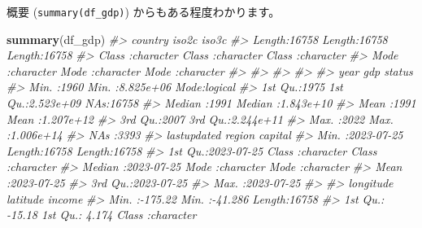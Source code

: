 \documentclass[
  xelatex, ja=standard]{bxjsbook}
\newenvironment{Shaded}{\begin{snugshade}}{\end{snugshade}}
\newcommand{\CommentTok}[1]{\textcolor[rgb]{0.56,0.35,0.01}{\textit{#1}}}
\newcommand{\FunctionTok}[1]{\textcolor[rgb]{0.13,0.29,0.53}{\textbf{#1}}}
\newcommand{\NormalTok}[1]{#1}
\theoremstyle{definition}
\theoremstyle{definition}
\theoremstyle{definition}
\theoremstyle{definition}
\theoremstyle{remark}
\begin{document}
概要 (\texttt{summary(df\_gdp)}) からもある程度わかります。

\begin{Shaded}
\begin{Highlighting}[]
\FunctionTok{summary}\NormalTok{(df\_gdp) }
\CommentTok{\#\textgreater{}    country             iso2c              iso3c          }
\CommentTok{\#\textgreater{}  Length:16758       Length:16758       Length:16758      }
\CommentTok{\#\textgreater{}  Class :character   Class :character   Class :character  }
\CommentTok{\#\textgreater{}  Mode  :character   Mode  :character   Mode  :character  }
\CommentTok{\#\textgreater{}                                                          }
\CommentTok{\#\textgreater{}                                                          }
\CommentTok{\#\textgreater{}                                                          }
\CommentTok{\#\textgreater{}                                                          }
\CommentTok{\#\textgreater{}       year           gdp             status       }
\CommentTok{\#\textgreater{}  Min.   :1960   Min.   :8.825e+06   Mode:logical  }
\CommentTok{\#\textgreater{}  1st Qu.:1975   1st Qu.:2.523e+09   NA\textquotesingle{}s:16758    }
\CommentTok{\#\textgreater{}  Median :1991   Median :1.843e+10                 }
\CommentTok{\#\textgreater{}  Mean   :1991   Mean   :1.207e+12                 }
\CommentTok{\#\textgreater{}  3rd Qu.:2007   3rd Qu.:2.244e+11                 }
\CommentTok{\#\textgreater{}  Max.   :2022   Max.   :1.006e+14                 }
\CommentTok{\#\textgreater{}                 NA\textquotesingle{}s   :3393                      }
\CommentTok{\#\textgreater{}   lastupdated            region            capital         }
\CommentTok{\#\textgreater{}  Min.   :2023{-}07{-}25   Length:16758       Length:16758      }
\CommentTok{\#\textgreater{}  1st Qu.:2023{-}07{-}25   Class :character   Class :character  }
\CommentTok{\#\textgreater{}  Median :2023{-}07{-}25   Mode  :character   Mode  :character  }
\CommentTok{\#\textgreater{}  Mean   :2023{-}07{-}25                                        }
\CommentTok{\#\textgreater{}  3rd Qu.:2023{-}07{-}25                                        }
\CommentTok{\#\textgreater{}  Max.   :2023{-}07{-}25                                        }
\CommentTok{\#\textgreater{}                                                            }
\CommentTok{\#\textgreater{}    longitude          latitude          income         }
\CommentTok{\#\textgreater{}  Min.   :{-}175.22   Min.   :{-}41.286   Length:16758      }
\CommentTok{\#\textgreater{}  1st Qu.: {-}15.18   1st Qu.:  4.174   Class :character  }

\end{Highlighting}
\end{Shaded}
\end{document}
